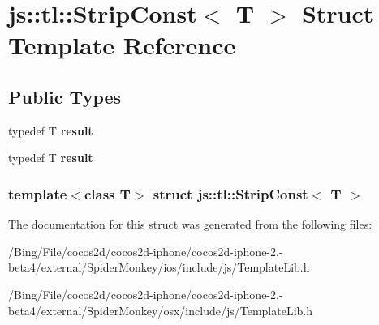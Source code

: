 \hypertarget{structjs_1_1tl_1_1_strip_const}{\section{js\-:\-:tl\-:\-:Strip\-Const$<$ T $>$ Struct Template Reference}
\label{structjs_1_1tl_1_1_strip_const}
}
\subsection*{Public Types}
\begin{DoxyCompactItemize}
\item 
\hypertarget{structjs_1_1tl_1_1_strip_const_a1017b410398fa3aeecd3e3f7a9c4c7ff}{typedef T {\bfseries result}}\label{structjs_1_1tl_1_1_strip_const_a1017b410398fa3aeecd3e3f7a9c4c7ff}

\item 
\hypertarget{structjs_1_1tl_1_1_strip_const_a1017b410398fa3aeecd3e3f7a9c4c7ff}{typedef T {\bfseries result}}\label{structjs_1_1tl_1_1_strip_const_a1017b410398fa3aeecd3e3f7a9c4c7ff}

\end{DoxyCompactItemize}
\subsubsection*{template$<$class T$>$ struct js\-::tl\-::\-Strip\-Const$<$ T $>$}



The documentation for this struct was generated from the following files\-:\begin{DoxyCompactItemize}
\item 
/\-Bing/\-File/cocos2d/cocos2d-\/iphone/cocos2d-\/iphone-\/2.-\/beta4/external/\-Spider\-Monkey/ios/include/js/Template\-Lib.\-h\item 
/\-Bing/\-File/cocos2d/cocos2d-\/iphone/cocos2d-\/iphone-\/2.-\/beta4/external/\-Spider\-Monkey/osx/include/js/Template\-Lib.\-h\end{DoxyCompactItemize}
